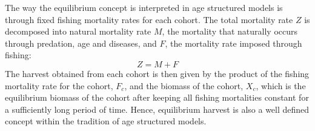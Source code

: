 \documentclass[11pt,fleqn]{book} %
\begin{document}
The way the equilibrium concept is interpreted in age structured models is through fixed fishing mortality rates for each cohort. The total mortality rate $Z$ is decomposed into natural mortality rate $M$, the mortality that naturally occurs through predation, age and diseases, and $F$, the mortality rate imposed through fishing:
\begin{equation} 
\label{eq:mortality}
Z = M + F
\end{equation}
The harvest obtained from each cohort is then given by the product of the fishing mortality rate for the cohort, $F_c$, and the biomass of the cohort, $X_c$, which is the equilibrium biomass of the cohort after keeping all fishing mortalities constant for a sufficiently long period of time. Hence, equilibrium harvest is also a well defined concept within the tradition of age structured models.
\end{document}
